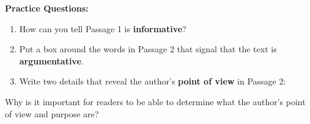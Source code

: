 \documentclass[12pt]{article}
\begin{document}
\vspace{1em}

\begin{tcolorbox}[colframe=black!60, colback=white, 
coltitle=black, colbacktitle=black!15, fonttitle=\bfseries\Large, 
title=Independent Practice, halign title=center, left=10pt, right=10pt, top=10pt, bottom=15pt]
\textbf{Practice Questions:}
\begin{enumerate}[itemsep=1em]
    \item How can you tell Passage 1 is \textbf{informative}?
\vspace{4em}
    \item Put a box around the words in Passage 2 that signal that the text is \textbf{argumentative}.
    \item Write two details that reveal the author's \textbf{point of view} in Passage 2: 
\vspace{8em}
\end{enumerate}
\end{tcolorbox}

\vspace{1em}

\begin{tcolorbox}[colframe=black!60, colback=white, 
coltitle=black, colbacktitle=black!15, fonttitle=\bfseries\Large, 
title=Exit Ticket, halign title=center, left=10pt, right=10pt, top=10pt, bottom=15pt]
Why is it important for readers to be able to determine what the author's point of view and purpose are?
\vspace{5cm}

\end{tcolorbox}
\end{document}

